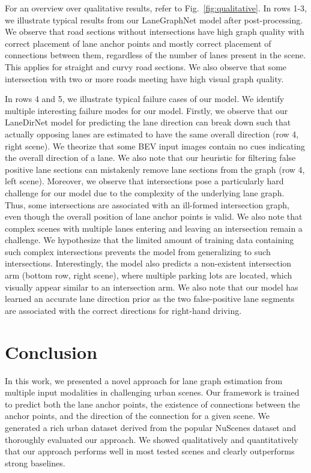 \documentclass[letterpaper, 10 pt, conference]{ieeeconf}
\begin{document}
For an overview over qualitative results, refer to Fig.~\ref{fig:qualitative}. In rows 1-3, we illustrate typical results from our LaneGraphNet model after post-processing. We observe that road sections without intersections have high graph quality with correct placement of lane anchor points and mostly correct placement of connections between them, regardless of the number of lanes present in the scene. This applies for straight and curvy road sections. We also observe that some intersection with two or more roads meeting have high visual graph quality.


In rows 4 and 5, we illustrate typical failure cases of our model. We identify multiple interesting failure modes for our model. Firstly, we observe that our LaneDirNet model for predicting the lane direction can break down such that actually opposing lanes are estimated to have the same overall direction (row 4, right scene). We theorize that some BEV input images contain no cues indicating the overall direction of a lane. We also note that our heuristic for filtering false positive lane sections can mistakenly remove lane sections from the graph (row 4, left scene). Moreover, we observe that intersections pose a particularly hard challenge for our model due to the complexity of the underlying lane graph. Thus, some intersections are associated with an ill-formed intersection graph, even though the overall position of lane anchor points is valid. We also note that complex scenes with multiple lanes entering and leaving an intersection remain a challenge. We hypothesize that the limited amount of training data containing such complex intersections prevents the model from generalizing to such intersections. Interestingly, the model also predicts a non-existent intersection arm (bottom row, right scene), where multiple parking lots are located, which visually appear similar to an intersection arm. We also note that our model has learned an accurate lane direction prior as the two false-positive lane segments are associated with the correct directions for right-hand driving. 
\section{Conclusion}
\label{sec:conclusion}
In this work, we presented a novel approach for lane graph estimation from multiple input modalities in challenging urban scenes. Our framework is trained to predict both the lane anchor points, the existence of connections between the anchor points, and the direction of the connection for a given scene. We generated a rich urban dataset derived from the popular NuScenes dataset and thoroughly evaluated our approach. We showed qualitatively and quantitatively that our approach performs well in most tested scenes and clearly outperforms strong baselines. 












{\small


}
\end{document}
